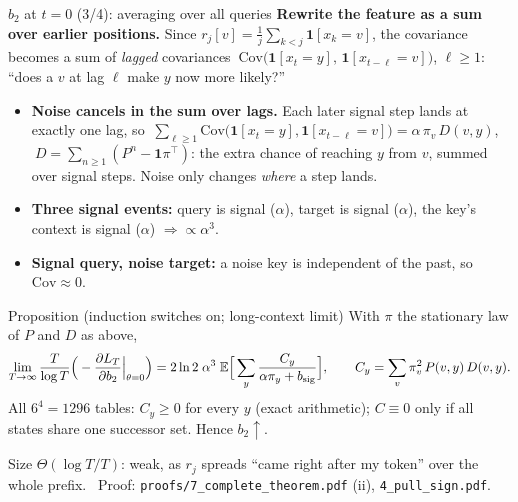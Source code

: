 \documentclass[aspectratio=169,11pt]{beamer}
\newcommand{\1}{\mathbf{1}}
\begin{document}
\begin{frame}{$b_2$ at $t=0$ (3/4): averaging over all queries}
\footnotesize\setlength{\abovedisplayskip}{2pt}\setlength{\belowdisplayskip}{2pt}
\textbf{Rewrite the feature as a sum over earlier positions.} Since $r_j[v]=\frac1j\sum_{k<j}\1[x_k=v]$, the covariance
becomes a sum of \emph{lagged} covariances $\ \mathrm{Cov}\big(\1[x_t=y],\,\1[x_{t-\ell}=v]\big)$, $\ell\ge1$: ``does a $v$ at lag $\ell$
make $y$ now more likely?''
\begin{itemize}
\item \textbf{Noise cancels in the sum over lags.} Each later signal step lands at exactly one lag, so
$\ \sum_{\ell\ge1}\mathrm{Cov}\big(\1[x_t=y],\1[x_{t-\ell}=v]\big)=\alpha\,\pi_v\,D(v,y)$, $\ D=\sum_{n\ge1}(P^n-\1\pi^\top)$:
the extra chance of reaching $y$ from $v$, summed over signal steps. Noise only changes \emph{where} a step lands.
\item \textbf{Three signal events:} query is signal ($\alpha$), target is signal ($\alpha$), the key's context is signal ($\alpha$) $\Rightarrow\propto\alpha^3$.
\item \textbf{Signal query, noise target:} a noise key is independent of the past, so $\mathrm{Cov}\approx0$.
\end{itemize}
\vspace{-0.7em}
\begin{block}{Proposition (induction switches on; long-context limit)}
With $\pi$ the stationary law of $P$ and $D$ as above,
\[
\lim_{T\to\infty}\frac{T}{\log T}\Big(-\frac{\partial L_T}{\partial b_2}\Big|_{\theta=0}\Big)=2\ln2\;\alpha^3\;\mathbb E\Big[\sum_y\frac{C_y}{\alpha\pi_y+b_{\rm sig}}\Big],
\qquad C_y=\sum_v\pi_v^2\,P(v,y)\,D(v,y).
\]
All $6^4=1296$ tables: $C_y\ge0$ for every $y$ (exact arithmetic); $C\equiv0$ only if all states share one successor set. Hence $b_2\uparrow$.
\end{block}
Size $\Theta(\log T/T)$: weak, as $r_j$ spreads ``came right after my token'' over the whole prefix.
{\color{gray}\ Proof: \texttt{proofs/7\_complete\_theorem.pdf} (ii), \texttt{4\_pull\_sign.pdf}.}
\end{frame}
\end{document}
